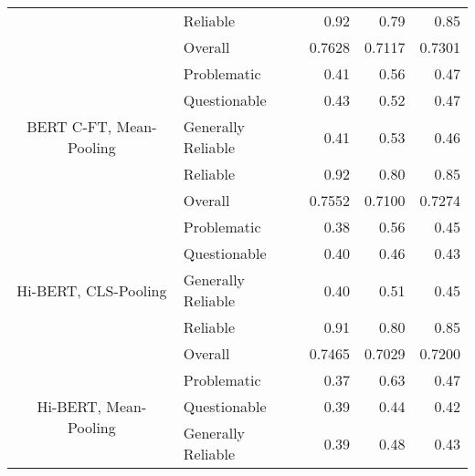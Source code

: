 \begin{table}[htbp]
\begin{longtable}{| c | l | r | r | r |}
                                                          & Reliable           & 0.92               & 0.79            & 0.85            \\\cline{2-5}
                                                          & Overall            & 0.7628             & 0.7117          & 0.7301          \\
        \hline
        \multirow{5}{*}{BERT C-FT, Mean-Pooling}          & Problematic        & 0.41               & 0.56            & 0.47            \\
                                                          & Questionable       & 0.43               & 0.52            & 0.47            \\
                                                          & Generally Reliable & 0.41               & 0.53            & 0.46            \\
                                                          & Reliable           & 0.92               & 0.80            & 0.85            \\\cline{2-5}
                                                          & Overall            & 0.7552             & 0.7100          & 0.7274          \\
        \hline
        \multirow{5}{*}{Hi-BERT, CLS-Pooling}             & Problematic        & 0.38               & 0.56            & 0.45            \\
                                                          & Questionable       & 0.40               & 0.46            & 0.43            \\
                                                          & Generally Reliable & 0.40               & 0.51            & 0.45            \\
                                                          & Reliable           & 0.91               & 0.80            & 0.85            \\\cline{2-5}
                                                          & Overall            & 0.7465             & 0.7029          & 0.7200          \\
        \hline
        \multirow{5}{*}{Hi-BERT, Mean-Pooling}            & Problematic        & 0.37               & 0.63            & 0.47            \\
                                                          & Questionable       & 0.39               & 0.44            & 0.42            \\
                                                          & Generally Reliable & 0.39               & 0.48            & 0.43            \\

\end{longtable}
\end{table}
